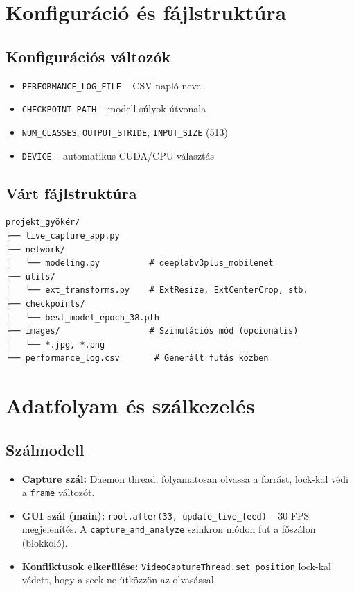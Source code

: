 \section{Konfiguráció és fájlstruktúra}

\subsection{Konfigurációs változók}
\begin{itemize}
    \item \texttt{PERFORMANCE\_LOG\_FILE} – CSV napló neve
    \item \texttt{CHECKPOINT\_PATH} – modell súlyok útvonala
    \item \texttt{NUM\_CLASSES}, \texttt{OUTPUT\_STRIDE}, \texttt{INPUT\_SIZE} (513)
    \item \texttt{DEVICE} – automatikus CUDA/CPU választás
\end{itemize}

\subsection{Várt fájlstruktúra}
\begin{verbatim}
projekt_gyökér/
├── live_capture_app.py
├── network/
│   └── modeling.py          # deeplabv3plus_mobilenet
├── utils/
│   └── ext_transforms.py    # ExtResize, ExtCenterCrop, stb.
├── checkpoints/
│   └── best_model_epoch_38.pth
├── images/                  # Szimulációs mód (opcionális)
│   └── *.jpg, *.png
└── performance_log.csv       # Generált futás közben
\end{verbatim}

\section{Adatfolyam és szálkezelés}

\subsection{Szálmodell}
\begin{itemize}
    \item \textbf{Capture szál:} Daemon thread, folyamatosan olvassa a forrást, lock-kal védi a \texttt{frame} változót.
    \item \textbf{GUI szál (main):} \texttt{root.after(33, update\_live\_feed)} – 30 FPS megjelenítés. A \texttt{capture\_and\_analyze} szinkron módon fut a főszálon (blokkoló).
    \item \textbf{Konfliktusok elkerülése:} \texttt{VideoCaptureThread.set\_position} lock-kal védett, hogy a seek ne ütközzön az olvasással.
\end{itemize}


